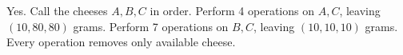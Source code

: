 Yes. Call the cheeses $A,B,C$ in order. Perform 4 operations on $A,C$, leaving $(10,80,80)$ grams. Perform 7 operations on $B,C$, leaving $\boxed{(10,10,10)}$ grams. Every operation removes only available cheese.

